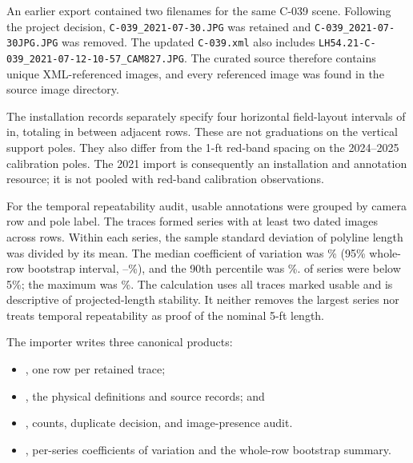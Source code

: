 \documentclass[12pt,letterpaper]{article}
\begin{document}
An earlier export contained two filenames for the same C-039 scene. Following the project decision, \texttt{C-039\_2021-07-30.JPG} was retained and \texttt{C-039\_2021-07-30JPG.JPG} was removed. The updated \texttt{C-039.xml} also includes \texttt{LH54.21-C-039\_2021-07-12-10-57\_CAM827.JPG}. The curated source therefore contains \ManualPoleImages{} unique XML-referenced images, and every referenced image was found in the source image directory.

The installation records separately specify four horizontal field-layout intervals of \FieldMarkIntervalIn{} in, totaling \AdjacentRowSpacingIn{} in between adjacent rows. These are not graduations on the vertical support poles. They also differ from the 1-ft red-band spacing on the 2024--2025 calibration poles. The 2021 import is consequently an installation and annotation resource; it is not pooled with red-band calibration observations.

For the temporal repeatability audit, usable annotations were grouped by camera row and pole label. The \ManualPoleUsable{} traces formed \PoleRepeatabilitySeries{} series with at least two dated images across \PoleRepeatabilityRows{} rows. Within each series, the sample standard deviation of polyline length was divided by its mean. The median coefficient of variation was \PoleRepeatabilityMedianCV{}\% (95\% whole-row bootstrap interval, \PoleRepeatabilityMedianCVLo{}--\PoleRepeatabilityMedianCVHi{}\%), and the 90th percentile was \PoleRepeatabilityNinetiethCV{}\%. \PoleRepeatabilityBelowFive{} of \PoleRepeatabilitySeries{} series were below 5\%; the maximum was \PoleRepeatabilityMaximumCV{}\%. The calculation uses all traces marked usable and is descriptive of projected-length stability. It neither removes the largest series nor treats temporal repeatability as proof of the nominal 5-ft length.

The importer writes three canonical products:
\begin{itemize}
\small
\item {}, one row per retained trace;
\item {}, the physical definitions and source records; and
\item {}, counts, duplicate decision, and image-presence audit.
\item {}, per-series coefficients of variation and the whole-row bootstrap summary.
\end{itemize}
\end{document}
